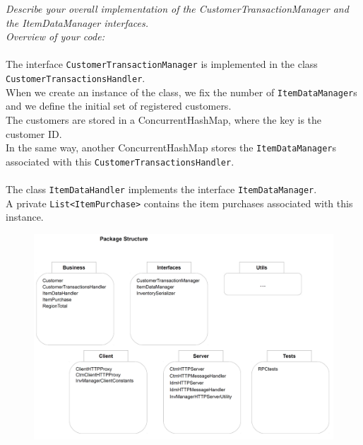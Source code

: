\documentclass[paper=a4, fontsize=11pt]{scrartcl} %
\numberwithin{equation}{section} %
\numberwithin{figure}{section} %
\numberwithin{table}{section} %
\begin{document}
\textit{Describe your overall implementation of the CustomerTransactionManager and the ItemDataManager interfaces. \\
Overview of your code:\\}
~\\
The interface \verb|CustomerTransactionManager| is implemented in the class \verb|CustomerTransactionsHandler|.\\
When we create an instance of the class, we fix the number of \verb|ItemDataManager|s and we define the initial set of registered customers.\\
The customers are stored in a ConcurrentHashMap, where the key is the customer ID. \\
In the same way, another ConcurrentHashMap stores the \verb|ItemDataManager|s associated with this \verb|CustomerTransactionsHandler|.\\
~\\
The class \verb|ItemDataHandler| implements the interface \verb|ItemDataManager|. \\
A private \verb|List<ItemPurchase>| contains the item purchases associated with this instance.\\
\begin{figure}[h]
    \includegraphics[width=1.1\textwidth,center]{PackageStructure.png}
\end{figure}
\end{document}
